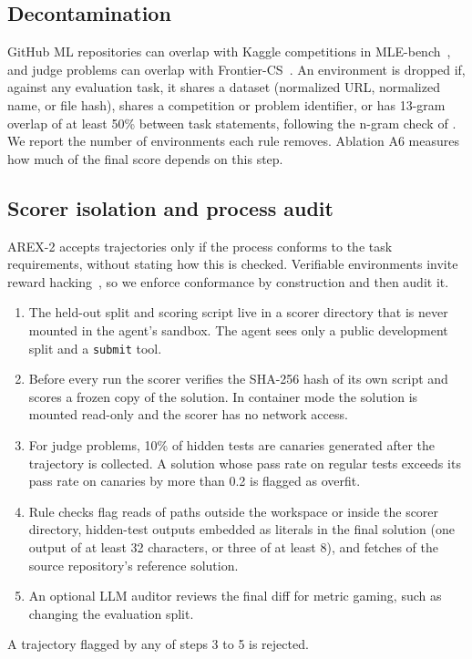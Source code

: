 \documentclass[11pt]{article}
\newcommand{\code}[1]{\texttt{#1}}
\begin{document}
\subsection{Decontamination}
\label{sec:decontam}
GitHub ML repositories can overlap with Kaggle competitions in MLE-bench~\citep{chan2025mlebench}, and judge problems can overlap with Frontier-CS~\citep{mang2025frontiercs}. An environment is dropped if, against any evaluation task, it shares a dataset (normalized URL, normalized name, or file hash), shares a competition or problem identifier, or has 13-gram overlap of at least 50\% between task statements, following the n-gram check of \citet{brown2020gpt3}. We report the number of environments each rule removes. Ablation A6 measures how much of the final score depends on this step.

\subsection{Scorer isolation and process audit}
\label{sec:audit}
AREX-2 accepts trajectories only if the process conforms to the task requirements, without stating how this is checked. Verifiable environments invite reward hacking~\citep{skalse2022rewardhacking}, so we enforce conformance by construction and then audit it.
\begin{enumerate}
  \item The held-out split and scoring script live in a scorer directory that is never mounted in the agent's sandbox. The agent sees only a public development split and a \code{submit} tool.
  \item Before every run the scorer verifies the SHA-256 hash of its own script and scores a frozen copy of the solution. In container mode the solution is mounted read-only and the scorer has no network access.
  \item For judge problems, 10\% of hidden tests are canaries generated after the trajectory is collected. A solution whose pass rate on regular tests exceeds its pass rate on canaries by more than 0.2 is flagged as overfit.
  \item Rule checks flag reads of paths outside the workspace or inside the scorer directory, hidden-test outputs embedded as literals in the final solution (one output of at least 32 characters, or three of at least 8), and fetches of the source repository's reference solution.
  \item An optional LLM auditor reviews the final diff for metric gaming, such as changing the evaluation split.
\end{enumerate}
A trajectory flagged by any of steps 3 to 5 is rejected.
\end{document}
